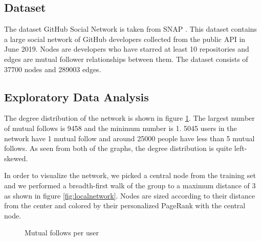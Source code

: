 \documentclass[9pt,twoside]{pnas-new}
\begin{document}
\subsection*{Dataset}
The dataset GitHub Social Network is taken from SNAP \cite{rozemberczki2019multiscale}. This dataset contains a large social network of GitHub developers collected from the public API in June 2019. Nodes are developers who have starred at least 10 repositories and edges are mutual follower relationships between them. The dataset consists of 37700 nodes and 289003 edges.
\subsection*{Exploratory Data Analysis}
The degree distribution of the network is shown in figure \ref{fig:follows}. The largest number of mutual follows is 9458 and the minimum number is 1. 5045 users in the network have 1 mutual follow and around 25000 people have less than 5 mutual follows. As seen from both of the graphs, the degree distribution is quite left-skewed. 

In order to visualize the network, we picked a central node from the training set and we performed a breadth-first walk of the group to a maximum distance of 3 as shown in figure \ref{fig:localnetwork}. Nodes are sized according to their distance from the center and colored by their personalized PageRank with the central node.

\begin{figure}[th]
    \centering
    \caption{Mutual follows per user}
    \label{fig:follows}
\end{figure}
\end{document}
